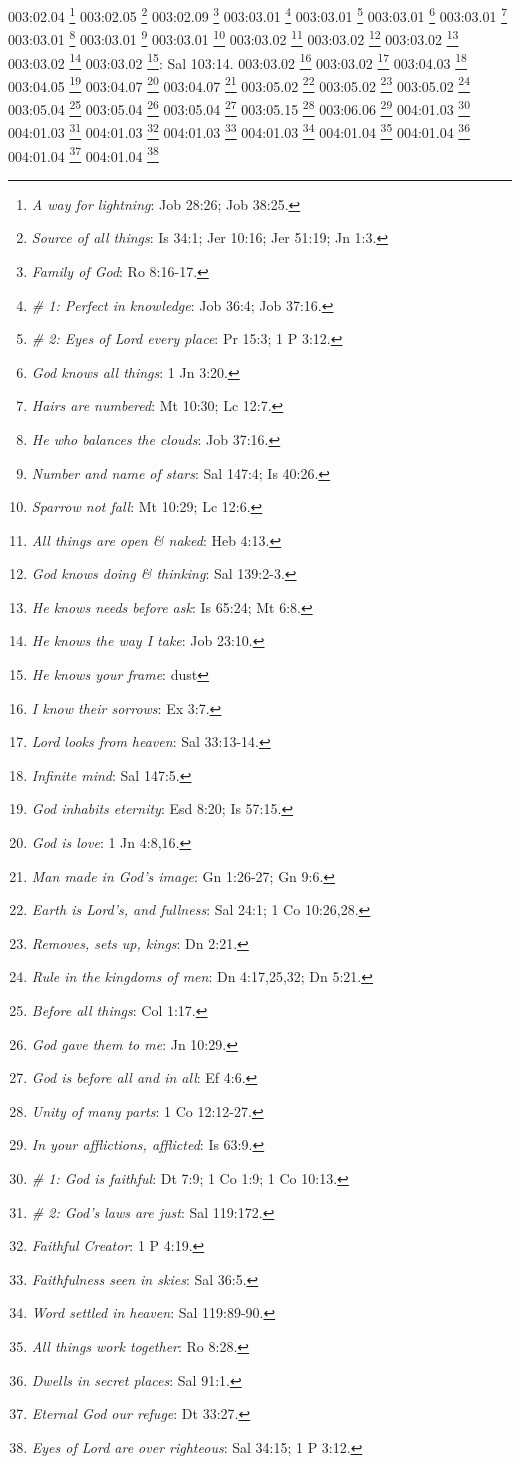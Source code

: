 {{003:02.04 \footnote{\textit{A way for lightning}: Job 28:26; Job 38:25.}
003:02.05 \footnote{\textit{Source of all things}: Is 34:1; Jer 10:16; Jer 51:19; Jn 1:3.}
003:02.09 \footnote{\textit{Family of God}: Ro 8:16-17.}
003:03.01 \footnote{\textit{# 1: Perfect in knowledge}: Job 36:4; Job 37:16.}
003:03.01 \footnote{\textit{# 2: Eyes of Lord every place}: Pr 15:3; 1 P 3:12.}
003:03.01 \footnote{\textit{God knows all things}: 1 Jn 3:20.}
003:03.01 \footnote{\textit{Hairs are numbered}: Mt 10:30; Lc 12:7.}
003:03.01 \footnote{\textit{He who balances the clouds}: Job 37:16.}
003:03.01 \footnote{\textit{Number and name of stars}: Sal 147:4; Is 40:26.}
003:03.01 \footnote{\textit{Sparrow not fall}: Mt 10:29; Lc 12:6.}
003:03.02 \footnote{\textit{All things are open & naked}: Heb 4:13.}
003:03.02 \footnote{\textit{God knows doing & thinking}: Sal 139:2-3.}
003:03.02 \footnote{\textit{He knows needs before ask}: Is 65:24; Mt 6:8.}
003:03.02 \footnote{\textit{He knows the way I take}: Job 23:10.}
003:03.02 \footnote{\textit{He knows your frame}: dust}: Sal 103:14.}
003:03.02 \footnote{\textit{I know their sorrows}: Ex 3:7.}
003:03.02 \footnote{\textit{Lord looks from heaven}: Sal 33:13-14.}
003:04.03 \footnote{\textit{Infinite mind}: Sal 147:5.}
003:04.05 \footnote{\textit{God inhabits eternity}: Esd 8:20; Is 57:15.}
003:04.07 \footnote{\textit{God is love}: 1 Jn 4:8,16.}
003:04.07 \footnote{\textit{Man made in God's image}: Gn 1:26-27; Gn 9:6.}
003:05.02 \footnote{\textit{Earth is Lord's, and fullness}: Sal 24:1; 1 Co 10:26,28.}
003:05.02 \footnote{\textit{Removes, sets up, kings}: Dn 2:21.}
003:05.02 \footnote{\textit{Rule in the kingdoms of men}: Dn 4:17,25,32; Dn 5:21.}
003:05.04 \footnote{\textit{Before all things}: Col 1:17.}
003:05.04 \footnote{\textit{God gave them to me}: Jn 10:29.}
003:05.04 \footnote{\textit{God is before all and in all}: Ef 4:6.}
003:05.15 \footnote{\textit{Unity of many parts}: 1 Co 12:12-27.}
003:06.06 \footnote{\textit{In your afflictions, afflicted}: Is 63:9.}
004:01.03 \footnote{\textit{# 1: God is faithful}: Dt 7:9; 1 Co 1:9; 1 Co 10:13.}
004:01.03 \footnote{\textit{# 2: God's laws are just}: Sal 119:172.}
004:01.03 \footnote{\textit{Faithful Creator}: 1 P 4:19.}
004:01.03 \footnote{\textit{Faithfulness seen in skies}: Sal 36:5.}
004:01.03 \footnote{\textit{Word settled in heaven}: Sal 119:89-90.}
004:01.04 \footnote{\textit{All things work together}: Ro 8:28.}
004:01.04 \footnote{\textit{Dwells in secret places}: Sal 91:1.}
004:01.04 \footnote{\textit{Eternal God our refuge}: Dt 33:27.}
004:01.04 \footnote{\textit{Eyes of Lord are over righteous}: Sal 34:15; 1 P 3:12.}
}
